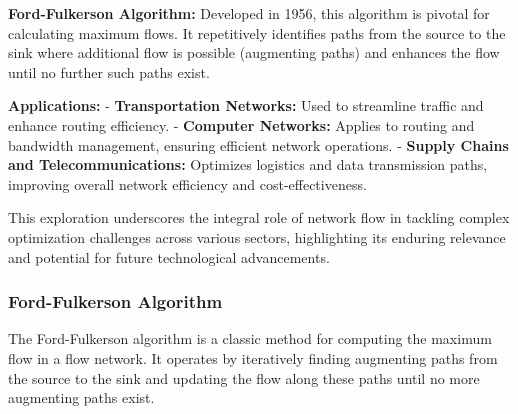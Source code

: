 \documentclass[12pt]{book} %
\begin{document}
\textbf{Ford-Fulkerson Algorithm:}
Developed in 1956, this algorithm is pivotal for calculating maximum flows. It repetitively identifies paths from the source to the sink where additional flow is possible (augmenting paths) and enhances the flow until no further such paths exist.

\textbf{Applications:}
- \textbf{Transportation Networks:} Used to streamline traffic and enhance routing efficiency.
- \textbf{Computer Networks:} Applies to routing and bandwidth management, ensuring efficient network operations.
- \textbf{Supply Chains and Telecommunications:} Optimizes logistics and data transmission paths, improving overall network efficiency and cost-effectiveness.

This exploration underscores the integral role of network flow in tackling complex optimization challenges across various sectors, highlighting its enduring relevance and potential for future technological advancements.


\FloatBarrier
\subsubsection{Ford-Fulkerson Algorithm}
The Ford-Fulkerson algorithm is a classic method for computing the maximum flow in a flow network. It operates by iteratively finding augmenting paths from the source to the sink and updating the flow along these paths until no more augmenting paths exist.
\end{document}
